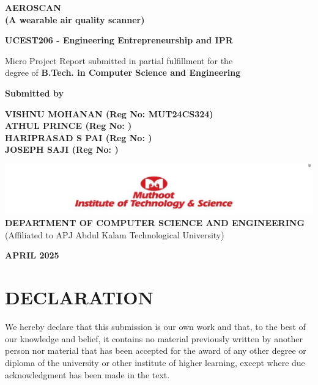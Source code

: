 \documentclass[a4paper,12pt]{report}
\begin{document}
\begin{titlepage}
    \centering
    
    {\LARGE \textbf{AEROSCAN} \\}
     {\small \textbf{(A wearable air quality scanner)} \\}
    
    \vfill
    
    {\Large \textbf{UCEST206 - Engineering Entrepreneurship and IPR}}\\
    
    \vfill

    {\normalsize Micro Project Report submitted in partial fulfillment for the}\\
    {\normalsize degree of \textbf{B.Tech. in Computer Science and Engineering}}
    
    \vfill

    \textbf{Submitted by}\\
    
    \vspace{5mm}
    \begin{center}
        \textbf{VISHNU MOHANAN (Reg No: MUT24CS324)}\\
        \textbf{ATHUL PRINCE (Reg No: )}\\
        \textbf{HARIPRASAD S PAI (Reg No: )}\\
        \textbf{JOSEPH SAJI (Reg No: )}
    \end{center}

    \vfill

    \includegraphics[width=1.0\textwidth]{muthoot_logo.jpg} \\[2.0cm]
    
    \textbf{DEPARTMENT OF COMPUTER SCIENCE AND ENGINEERING}\\
    (Affiliated to APJ Abdul Kalam Technological University)\\
    
    \vfill
    
    \textbf{APRIL 2025}
\end{titlepage}



\chapter*{DECLARATION}
We hereby declare that this submission is our own work and that, to the best of our knowledge and belief, it contains no material previously written by another person nor material that has been accepted for the award of any other degree or diploma of the university or other institute of higher learning, except where due acknowledgment has been made in the text.
\end{document}
